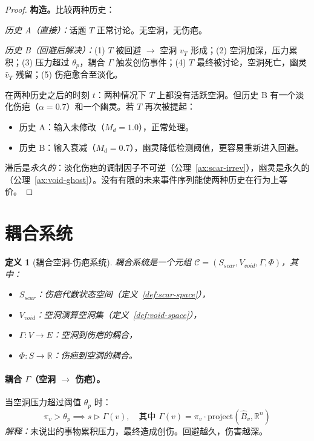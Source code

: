 \documentclass[11pt]{article}
\newtheorem{definition}[theorem]{定义}
\begin{document}
\begin{proof}
\textbf{构造。}比较两种历史：

\emph{历史 A（直接）：}话题 $T$ 正常讨论。无空洞，无伤疤。

\emph{历史 B（回避后解决）：}(1) $T$ 被回避 $\to$ 空洞 $v_T$ 形成；(2) 空洞加深，压力累积；(3) 压力超过 $\theta_p$，耦合 $\Gamma$ 触发创伤事件；(4) $T$ 最终被讨论，空洞死亡，幽灵 $\hat{v}_T$ 残留；(5) 伤疤愈合至淡化。

在两种历史之后的时刻 $t$：两种情况下 $T$ 上都没有活跃空洞。但历史 B 有一个淡化伤疤（$\alpha = 0.7$）和一个幽灵。若 $T$ 再次被提起：
\begin{itemize}
\item 历史 A：输入未修改（$M_d = 1.0$），正常处理。
\item 历史 B：输入衰减（$M_d = 0.7$），幽灵降低检测阈值，更容易重新进入回避。
\end{itemize}

滞后是\emph{永久的}：淡化伤疤的调制因子不可逆（公理~\ref{ax:scar-irrev}），幽灵是永久的（公理~\ref{ax:void-ghost}）。没有有限的未来事件序列能使两种历史在行为上等价。
\end{proof}

\section{耦合系统}
\label{sec:coupled}

\begin{definition}[耦合空洞-伤疤系统]
\label{def:coupled}
耦合系统是一个元组 $\mathcal{C} = (S_{scar}, V_{void}, \Gamma, \Phi)$，其中：
\begin{itemize}
\item $S_{scar}$：伤疤代数状态空间（定义~\ref{def:scar-space}），
\item $V_{void}$：空洞演算空洞集（定义~\ref{def:void-space}），
\item $\Gamma: V \to E$：空洞到伤疤的耦合，
\item $\Phi: S \to \mathbb{R}$：伤疤到空洞的耦合。
\end{itemize}
\end{definition}

\paragraph{耦合 $\Gamma$（空洞 $\to$ 伤疤）。}
当空洞压力超过阈值 $\theta_p$ 时：
\begin{equation}
\pi_v > \theta_p \implies s \triangleright \Gamma(v), \quad \text{其中 } \Gamma(v) = \pi_v \cdot \text{project}(\hat{B}_v, \mathbb{R}^n)
\end{equation}
\emph{解释：}未说出的事物累积压力，最终造成创伤。回避越久，伤害越深。
\end{document}

